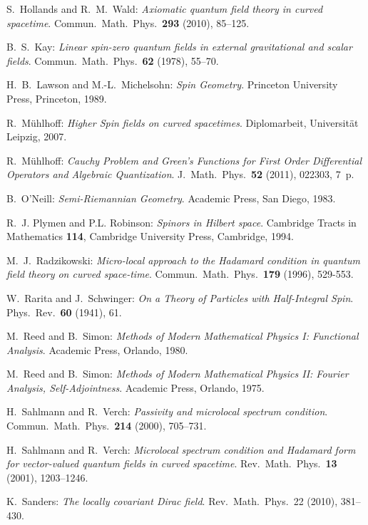 \documentclass[a4paper,11pt]{amsart}
\theoremstyle{definition}
\begin{document}
\begin{thebibliography}{11}
{\sc S.~Hollands and R.~M.~Wald:}
{\em Axiomatic quantum field theory in curved spacetime}.
Commun.\ Math.\ Phys.~\textbf{293} (2010), 85--125.

{\sc B.~S.~Kay:}
{\em Linear spin-zero quantum fields in external gravitational and scalar fields}.
Commun.\ Math.\ Phys.~\textbf{62} (1978), 55--70.

{\sc H.~B.~Lawson and M.-L.~Michelsohn:}
{\em Spin Geometry}.
Princeton University Press, Princeton, 1989.

{\sc R.~M\"uhlhoff:}
{\em Higher Spin fields on curved spacetimes}.
Diplomarbeit, Universit\"at Leipzig, 2007.

{\sc R.~M\"uhlhoff:}
{\em Cauchy Problem and Green's Functions for First Order Differential Operators and Algebraic Quantization}.
J.\ Math.\ Phys.~\textbf{52} (2011), 022303, 7~p.

{\sc B.~O'Neill:}
{\em Semi-Riemannian Geometry}.
Academic Press, San Diego, 1983.

{\sc R.~J. Plymen and P.L. Robinson:}
{\em Spinors in Hilbert space}.
Cambridge Tracts in Mathematics \textbf{114}, Cambridge University Press, Cambridge, 1994.

{\sc M.~J.~Radzikowski:}
{\em Micro-local approach to the Hadamard condition in quantum field theory on curved space-time}.
Commun.\ Math.\ Phys.~\textbf{179} (1996), 529-553.

{\sc W.~Rarita and J.~Schwinger:}
{\em On a Theory of Particles with Half-Integral Spin}.
Phys.\ Rev.~\textbf{60} (1941), 61.

{\sc M.~Reed and B.~Simon:}
{\em Methods of Modern Mathematical Physics I: Functional Analysis}.
Academic Press, Orlando, 1980.

{\sc M.~Reed and B.~Simon:}
{\em Methods of Modern Mathematical Physics II: Fourier Analysis, Self-Adjointness}.
Academic Press, Orlando, 1975.

{\sc H.~Sahlmann and R.~Verch:}
{\em Passivity and microlocal spectrum condition}.
Commun.\ Math.\ Phys.~\textbf{214} (2000), 705--731.

{\sc H.~Sahlmann and R.~Verch:}
{\em Microlocal spectrum condition and Hadamard form for vector-valued quantum fields in curved spacetime}. 
Rev.\ Math.\ Phys.~\textbf{13} (2001), 1203--1246.                            

{\sc K.~Sanders:}
{\em The locally covariant Dirac field}.
Rev.~Math.~Phys.~22 (2010), 381--430.


\end{thebibliography}
\end{document}
